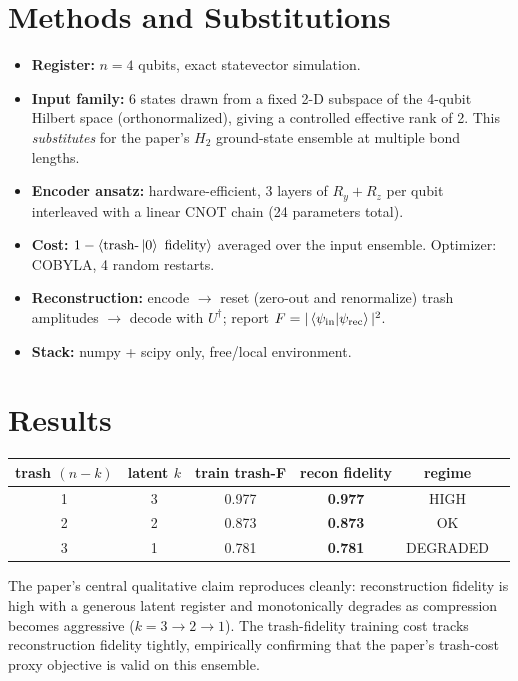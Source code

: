 \documentclass[11pt]{article}
\begin{document}
\section{Methods and Substitutions}
\begin{itemize}
  \item \textbf{Register:} $n = 4$ qubits, exact statevector simulation.
  \item \textbf{Input family:} 6 states drawn from a fixed 2-D subspace of the
        4-qubit Hilbert space (orthonormalized), giving a controlled effective
        rank of 2. This \emph{substitutes} for the paper's $H_2$ ground-state
        ensemble at multiple bond lengths.
  \item \textbf{Encoder ansatz:} hardware-efficient, 3 layers of $R_y+R_z$ per
        qubit interleaved with a linear CNOT chain (24 parameters total).
  \item \textbf{Cost:} $1 - \langle \text{trash-}\ket{0}\text{ fidelity} \rangle$
        averaged over the input ensemble. Optimizer: COBYLA, 4 random restarts.
  \item \textbf{Reconstruction:} encode $\to$ reset (zero-out and renormalize)
        trash amplitudes $\to$ decode with $U^\dagger$; report
        $F = |\braket{\psi_\text{in}}{\psi_\text{rec}}|^2$.
  \item \textbf{Stack:} numpy + scipy only, free/local environment.
\end{itemize}

\section{Results}
\begin{tabular}{cccccc}
\toprule
trash $(n-k)$ & latent $k$ & train trash-F & recon fidelity & regime \\
\midrule
1 & 3 & 0.977 & \textbf{0.977} & HIGH \\
2 & 2 & 0.873 & \textbf{0.873} & OK \\
3 & 1 & 0.781 & \textbf{0.781} & DEGRADED \\
\bottomrule
\end{tabular}

\medskip
The paper's central qualitative claim reproduces cleanly: reconstruction
fidelity is high with a generous latent register and monotonically degrades as
compression becomes aggressive ($k = 3 \to 2 \to 1$). The trash-fidelity
training cost tracks reconstruction fidelity tightly, empirically confirming
that the paper's trash-cost proxy objective is valid on this ensemble.
\end{document}
